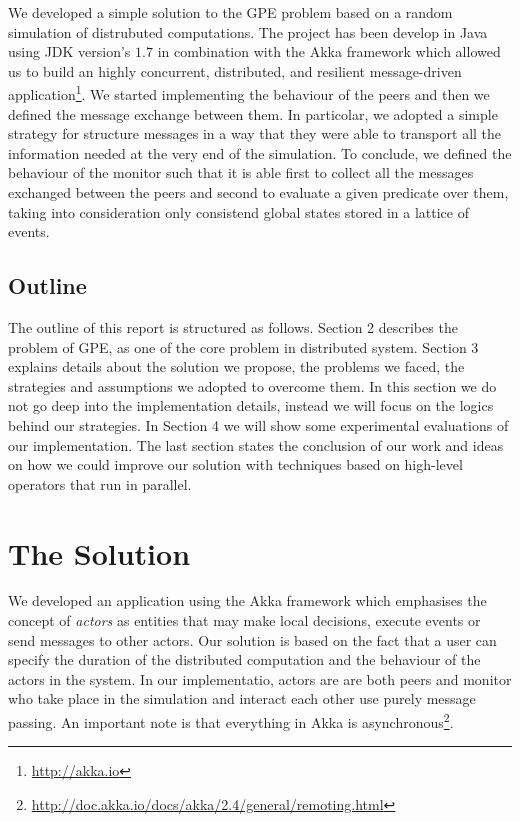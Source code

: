 \documentclass[10pt]{article}
\begin{document}
We developed a simple solution to the GPE problem based on a random simulation of distrubuted computations. The project has been develop in Java using JDK version's $1.7$ in combination with the Akka framework which allowed us to build an highly concurrent, distributed, and resilient message-driven application\footnote{\url{http://akka.io}}. We started implementing the behaviour of the peers and then we defined the message exchange between them. In particolar, we adopted a simple strategy for structure messages in a way that they were able to transport all the information needed at the very end of the simulation. To conclude, we defined the behaviour of the monitor such that it is able first to collect all the messages exchanged between the peers and second to evaluate a given predicate over them, taking into consideration only consistend global states stored in a lattice of events.

\subsection{Outline}

The outline of this report is structured as follows. Section 2 describes the problem of GPE, as one of the core problem in distributed system. Section 3 explains details about the solution we propose, the problems we faced, the strategies and assumptions we adopted to overcome them. In this section we do not go deep into the implementation details, instead we will focus on the logics behind our strategies. In Section 4 we will show some experimental evaluations of our implementation. The last section states the conclusion of our work and ideas on how we could improve our solution with techniques based on high-level operators that run in parallel.

\section{The Solution}

We developed an application using the Akka framework which emphasises the concept of \textit{actors} as entities that may make local decisions, execute events or send messages to other actors. Our solution is based on the fact that a user can specify the duration of the distributed computation and the behaviour of the actors in the system. In our implementatio, actors are are both peers and monitor who take place in the simulation and interact each other use purely message passing. An important note is that everything in Akka is asynchronous\footnote{\url{http://doc.akka.io/docs/akka/2.4/general/remoting.html}}.
\end{document}

